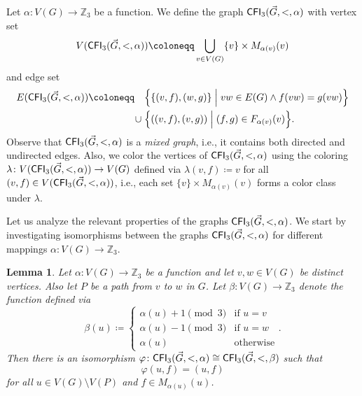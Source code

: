 \PassOptionsToPackage{dvipsnames,svgnames}{xcolor}\documentclass[10pt,a4paper]{article}
\newtheorem{lemma}{Lemma}[section]
\newcommand{\ZZ}{{\mathbb Z}}
\newcommand{\Bigmid}{\;\Big|\;}
\newcommand{\CFI}{{\sf CFI}}
\begin{document}
Let $\alpha\colon V(G) \to \ZZ_3$ be a function.
We define the graph $\CFI_3(\vec{G},<,\alpha)$ with vertex set
\[V(\CFI_3(\vec{G},<,\alpha)) \coloneqq \bigcup_{v \in V(G)} \{v\} \times M_{\alpha(v)}(v)\]
and edge set
\begin{align*}
 E(\CFI_3(\vec{G},<,\alpha)) \coloneqq \quad  &\Big\{\{(v,f),(w,g)\} \Bigmid vw \in E(G) \wedge f(vw) = g(vw)\Big\}\\
                                       \cup\; &\Big\{((v,f),(v,g)) \Bigmid (f,g) \in F_{\alpha(v)}(v)\Big\}.
\end{align*}
Observe that $\CFI_3(\vec{G},<,\alpha)$ is a \emph{mixed graph}, i.e., it contains both directed and undirected edges.
Also, we color the vertices of $\CFI_3(\vec{G},<,\alpha)$ using the coloring $\lambda\colon V(\CFI_3(\vec{G},<,\alpha)) \to V(G)$ defined via $\lambda(v,f) \coloneqq v$ for all $(v,f) \in V(\CFI_3(\vec{G},<,\alpha))$, i.e., each set $\{v\} \times M_{\alpha(v)}(v)$ forms a color class under $\lambda$.

Let us analyze the relevant properties of the graphs $\CFI_3(\vec{G},<,\alpha)$.
We start by investigating isomorphisms between the graphs $\CFI_3(\vec{G},<,\alpha)$ for different mappings $\alpha\colon V(G) \to \ZZ_3$.

\begin{lemma}
 \label{lem:twist-along-path}
 Let $\alpha\colon V(G) \to \ZZ_3$ be a function and let $v,w \in V(G)$ be distinct vertices.
 Also let $P$ be a path from $v$ to $w$ in $G$.
 Let $\beta\colon V(G) \to \ZZ_3$ denote the function defined via
 \[\beta(u) \coloneqq \begin{cases}
                       \alpha(u) + 1 \pmod{3} &\text{if } u = v\\
                       \alpha(u) - 1 \pmod{3} &\text{if } u = w\\
                       \alpha(u)              &\text{otherwise}
                      \end{cases}.\]
 Then there is an isomorphism $\varphi\colon \CFI_3(\vec{G},<,\alpha) \cong \CFI_3(\vec{G},<,\beta)$ such that
 \[\varphi(u,f) = (u,f)\]
 for all $u \in V(G) \setminus V(P)$ and $f \in M_{\alpha(u)}(u)$.
\end{lemma}
\end{document}
